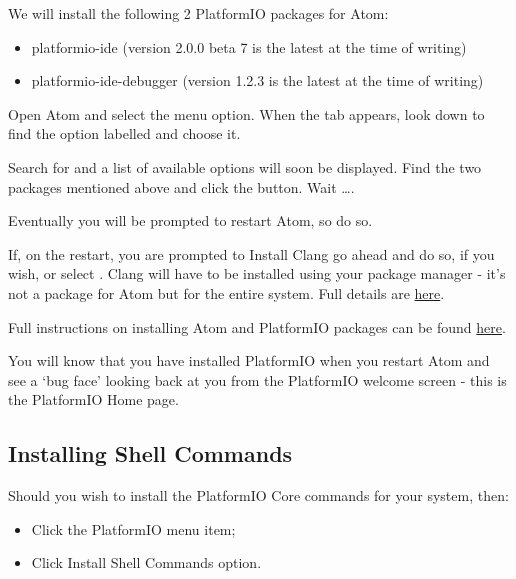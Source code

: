 We will install the following 2 PlatformIO packages for Atom:

\begin{itemize}
\item
  platformio-ide (version 2.0.0 beta 7 is the latest at the time of
  writing)
\item
  platformio-ide-debugger (version 1.2.3 is the latest at the time of
  writing)
\end{itemize}

Open Atom and select the  menu option. When the  tab appears, look down to find the option labelled  and choose it.

Search for  and a list of available options will soon be displayed. Find the two packages mentioned above and click the  button. Wait \ldots{}.

Eventually you will be prompted to restart Atom, so do so.

If, on the restart, you are prompted to Install Clang go ahead and do so, if you wish, or select . Clang will have to be installed using your package manager - it's not a package for Atom but for the entire system. Full details are \href{http://docs.platformio.org/en/latest/ide/atom.html\#ii-clang-for-intelligent-code-completion}{here}.

Full instructions on installing Atom and PlatformIO packages can be found \href{http://docs.platformio.org/en/latest/ide/atom.html\#clang-for-intelligent-code-completion}{here}.

You will know that you have installed PlatformIO when you restart Atom and see a `bug face' looking back at you from the PlatformIO welcome screen - this is the PlatformIO Home page.

\subsection{Installing Shell Commands}\label{installing-shell-commands}

Should you wish to install the PlatformIO Core commands for your system, then:

\begin{itemize}
	\item Click the PlatformIO menu item;
	\item Click Install Shell Commands option.
\end{itemize}

